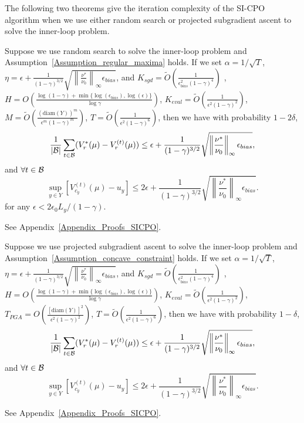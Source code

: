 The following two theorems give the iteration complexity of the SI-CPO algorithm when we use either random search or projected subgradient ascent to solve the inner-loop problem.

\begin{theorem}\label{Theorem_random_search_SICPO}
Suppose we use random search to solve the inner-loop problem and Assumption~\ref{Assumption_regular_maxima} holds. 
If we set $\alpha=1/\sqrt{T}$, $\eta=\epsilon+\frac{1}{(1-\gamma)^{3/2}}\sqrt{\left\|\frac{\nu^*}{\nu_0}\right\|_\infty\epsilon_{bias}}$, and 
${K_{sgd}=\widetilde{O}\left(\frac{1}{\epsilon_{bias}^2(1-\gamma)^4}\right)}$ , $ H=O\left(\frac{\log(1-\gamma)+\min\{\log(\epsilon_{bias}),\log(\epsilon)\}}{\log\gamma}\right)$, $K_{eval}=\widetilde{O}\left(\frac{1}{\epsilon^2(1-\gamma)^2}\right)$, ${M=\widetilde{O}\left(\frac{(\mathrm{diam}(Y))^m}{\epsilon^m(1-\gamma)^m}\right)}$, ${T=\widetilde{O}\left(\frac{1}{\epsilon^2(1-\gamma)^6}\right)}$, then we have with probability $1-2\delta$,
$$
    \frac{1}{|{\mathcal{B}}|}\sum_{t\in{\mathcal{B}}}(V_r^*(\mu)-V_r^{(t)}(\mu))\leq \epsilon+\frac{1}{(1-\gamma)^{3/2}}\sqrt{\left\|\frac{\nu^*}{\nu_0}\right\|_\infty\epsilon_{bias}},
$$
and $\forall t\in{\mathcal{B}}$
$$ \sup_{y\in Y}\left[V_{c_y}^{(t)}(\mu)-u_y\right]\leq 2\epsilon+\frac{1}{(1-\gamma)^{3/2}}\sqrt{\left\|\frac{\nu^*}{\nu_0}\right\|_\infty\epsilon_{bias}}.
$$
for any $\epsilon<2\epsilon_0 L_y/(1-\gamma)$.
\end{theorem}
See Appendix~\ref{Appendix_Proofs_SICPO}.
\endproof

\begin{theorem}\label{Theorem_PGA_SICPO}
Suppose we use projected subgradient ascent to solve the inner-loop problem and Assumption~\ref{Assumption_concave_constraint} holds. 
If we set $\alpha=1/\sqrt{T}$, $\eta=\epsilon+\frac{1}{(1-\gamma)^{3/2}}\sqrt{\left\|\frac{\nu^*}{\nu_0}\right\|_\infty\epsilon_{bias}}$, and 
${K_{sgd}=\widetilde{O}\left(\frac{1}{\epsilon_{bias}^2(1-\gamma)^4}\right)}$ , $ H=O\left(\frac{\log(1-\gamma)+\min\{\log(\epsilon_{bias}),\log(\epsilon)\}}{\log\gamma}\right)$, $K_{eval}=\widetilde{O}\left(\frac{1}{\epsilon^2(1-\gamma)^2}\right)$, ${T_{PGA}=O\left(\frac{[\mathrm{diam}(Y)]^2}{\epsilon^2(1-\gamma)^2}
    \right)}$, ${T=\widetilde{O}\left(\frac{1}{\epsilon^2(1-\gamma)^6}\right)}$, then we have with probability $1-\delta$,
$$
    \frac{1}{|{\mathcal{B}}|}\sum_{t\in{\mathcal{B}}}(V_r^*(\mu)-V_r^{(t)}(\mu))\leq \epsilon+\frac{1}{(1-\gamma)^{3/2}}\sqrt{\left\|\frac{\nu^*}{\nu_0}\right\|_\infty\epsilon_{bias}},
$$
and $\forall t\in{\mathcal{B}}$
$$ \sup_{y\in Y}\left[V_{c_y}^{(t)}(\mu)-u_y\right]\leq 2\epsilon+\frac{1}{(1-\gamma)^{3/2}}\sqrt{\left\|\frac{\nu^*}{\nu_0}\right\|_\infty\epsilon_{bias}}.
$$
\end{theorem}
See Appendix~\ref{Appendix_Proofs_SICPO}.
\endproof

